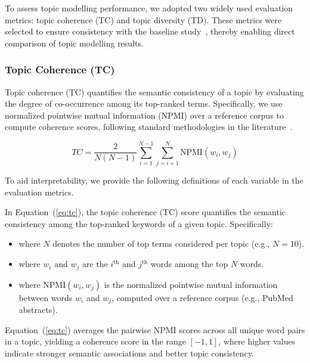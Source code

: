 \documentclass[authorproof,JACIII,researchpaper]{fujipressarticle}
\begin{document}
To assess topic modelling performance, we adopted two widely used evaluation metrics: topic coherence (TC) and topic diversity (TD). These metrics were selected to ensure consistency with the baseline study~\cite{lezhnina_depression_2023}, thereby enabling direct comparison of topic modelling results.

\subsubsection{Topic Coherence (TC)}

Topic coherence (TC) quantifies the semantic consistency of a topic by evaluating the degree of co-occurrence among its top-ranked terms. Specifically, we use normalized pointwise mutual information (NPMI) over a reference corpus to compute coherence scores, following standard methodologies in the literature~\cite{mimno_optimizing_2011,roder_exploring_2015}.

\begin{equation}
TC = \frac{2}{N(N-1)} \sum_{i=1}^{N-1} \sum_{j=i+1}^{N} \text{NPMI}(w_i, w_j)
\label{eq:tc}
\end{equation}

To aid interpretability, we provide the following definitions of each variable in the evaluation metrics.

{\color{red}In Equation~(\ref{eq:tc}), the topic coherence (TC) score quantifies the semantic consistency among the top-ranked keywords of a given topic.} Specifically:

\begin{itemize}
    \item where $N$ denotes the number of top terms considered per topic (e.g., $N = 10$).

    \item where $w_i$ and $w_j$ are the $i^{\text{th}}$ and $j^{\text{th}}$ words among the top $N$ words.

    \item where NPMI$(w_i, w_j)$ is the normalized pointwise mutual information between words $w_i$ and $w_j$, computed over a reference corpus (e.g., PubMed abstracts).
\end{itemize}

{\color{red}Equation~(\ref{eq:tc}) averages the pairwise NPMI scores across all unique word pairs in a topic, yielding a coherence score in the range $[-1, 1]$, where higher values indicate stronger semantic associations and better topic consistency.}
\end{document}
